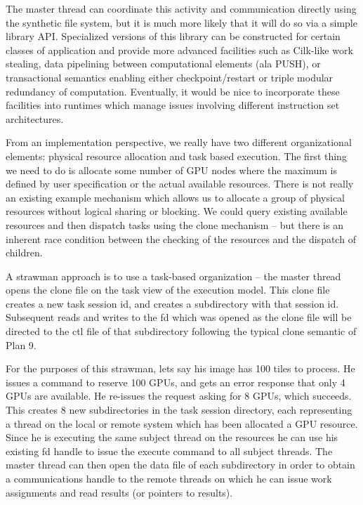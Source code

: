 \documentclass{sig-alternate}
\begin{document}
The master thread can coordinate this activity and communication directly 
using the synthetic file system, but it is much more likely that it will do
so via a simple library API.  Specialized versions of this library can be
constructed for certain classes of application and provide more advanced
facilities such as Cilk-like work stealing, data pipelining between 
computational elements (ala PUSH), or transactional semantics enabling 
either checkpoint/restart or triple modular redundancy of computation.
Eventually, it would be nice to incorporate these facilities into runtimes
which manage issues involving different instruction set architectures.

From an implementation perspective, we really have two different organizational
elements: physical resource allocation and task based execution.  The first
thing we need to do is allocate some number of GPU nodes where the maximum
is defined by user specification or the actual available resources.  There
is not really an existing example mechanism which allows us to allocate a
group of physical resources without logical sharing or blocking.  We could
query existing available resources and then dispatch tasks using the clone
mechanism -- but there is an inherent race condition between the checking of
the resources and the dispatch of children.

A strawman approach is to use a task-based organization -- the master thread
opens the clone file on the task view of the execution model.  This clone file
creates a new task session id, and creates a subdirectory with that session id.
Subsequent reads and writes to the fd which was opened as the clone file will be
directed to the ctl file of that subdirectory following the typical clone
semantic of Plan 9. 

For the purposes of this strawman, lets say his image has 100 tiles to process.  He issues a command to reserve 100 GPUs, and gets an error response that 
only 4 GPUs are available.  
He re-issues the request asking for 8 GPUs, which succeeds.
This creates 8 new subdirectories in the task session directory, each 
representing a thread on the local or remote system which has been allocated
a GPU resource.
Since he is executing the same subject thread on the resources he can use
his existing fd handle to issue the execute command to all subject threads.
The master thread can then open the data file of each subdirectory in order
to obtain a communications handle to the remote threads on which he can
issue work assignments and read results (or pointers to results).
\end{document}
